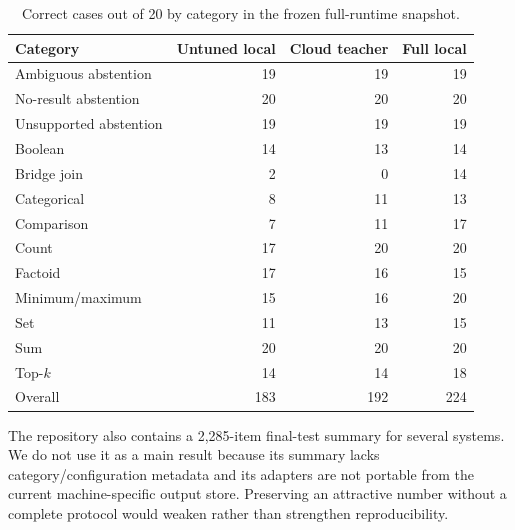 \begin{table}[h]
  \caption{Correct cases out of 20 by category in the frozen full-runtime snapshot.}
  \centering
  \scriptsize
  \begin{tabular}{lrrr}
    \toprule
    Category & Untuned local & Cloud teacher & Full local \\
    \midrule
    Ambiguous abstention & 19 & 19 & 19 \\
    No-result abstention & 20 & 20 & 20 \\
    Unsupported abstention & 19 & 19 & 19 \\
    Boolean & 14 & 13 & 14 \\
    Bridge join & 2 & 0 & 14 \\
    Categorical & 8 & 11 & 13 \\
    Comparison & 7 & 11 & 17 \\
    Count & 17 & 20 & 20 \\
    Factoid & 17 & 16 & 15 \\
    Minimum/maximum & 15 & 16 & 20 \\
    Set & 11 & 13 & 15 \\
    Sum & 20 & 20 & 20 \\
    Top-$k$ & 14 & 14 & 18 \\
    \midrule
    Overall & 183 & 192 & 224 \\
    \bottomrule
  \end{tabular}
\end{table}

The repository also contains a 2,285-item final-test summary for several systems.  We do not use
it as a main result because its summary lacks category/configuration metadata and its adapters
are not portable from the current machine-specific output store.  Preserving an attractive
number without a complete protocol would weaken rather than strengthen reproducibility.
